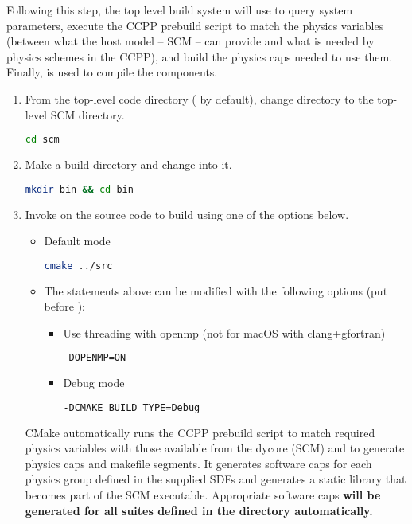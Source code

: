 Following this step, the top level build system will use  to query system parameters, execute the CCPP prebuild script to match the physics variables (between what the host model -- SCM -- can provide and what is needed by physics schemes in the CCPP), and build the physics caps needed to use them. Finally,  is used to compile the components.
\begin{enumerate}
 \item From the top-level code directory ( by default), change directory to the top-level SCM directory.
\begin{lstlisting}[language=bash]
cd scm
\end{lstlisting}
\item Make a build directory and change into it.
\begin{lstlisting}[language=bash]
mkdir bin && cd bin
\end{lstlisting}
\item Invoke  on the source code to build using one of the options below.
\begin{itemize}
\item Default mode
\begin{lstlisting}[language=bash]
cmake ../src
\end{lstlisting}
\item The statements above can be modified with the following options (put before ):
\begin{itemize}
\item Use threading with openmp (not for macOS with clang+gfortran)
\begin{lstlisting}[language=bash]
-DOPENMP=ON
\end{lstlisting}
\item Debug mode
\begin{lstlisting}[language=bash]
-DCMAKE_BUILD_TYPE=Debug
\end{lstlisting}
\end{itemize}
\end{itemize}

CMake automatically runs the CCPP prebuild script to match required physics variables with those available from the dycore (SCM) and to generate physics caps and makefile segments. It generates software caps for each physics group defined in the supplied SDFs and generates a static library that becomes part of the SCM executable. Appropriate software caps \textbf{will be generated for all suites defined in the  directory automatically.}


\end{enumerate}
